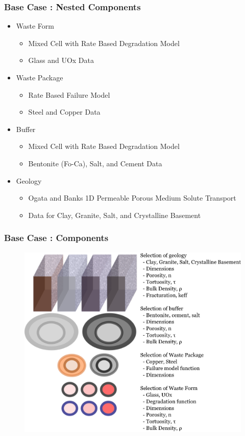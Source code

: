 

\begin{frame}
  \frametitle{Base Case : Nested Components}
  \begin{itemize}
    \item Waste Form
      \begin{itemize}
        \item Mixed Cell with  Rate Based Degradation Model
        \item Glass and UOx Data
      \end{itemize}
    \item Waste Package
      \begin{itemize}
        \item Rate Based Failure Model
        \item Steel and Copper Data
      \end{itemize}
    \item Buffer
      \begin{itemize}
        \item Mixed Cell with  Rate Based Degradation Model
        \item Bentonite (Fo-Ca), Salt, and Cement Data
      \end{itemize}
    \item Geology
      \begin{itemize}
        \item Ogata and Banks 1D Permeable Porous Medium Solute Transport
        \item Data for Clay, Granite, Salt, and Crystalline Basement
      \end{itemize}
  \end{itemize}
\end{frame}

\begin{frame}[ctb!]
  \frametitle{Base Case : Components}
  \begin{figure}[h!]
      \includegraphics[height=0.8\textheight]{components.eps}
  \end{figure}
\end{frame}

